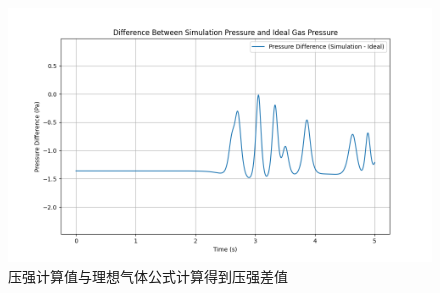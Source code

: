 \documentclass[11pt]{article}
\begin{document}
\begin{question}
\begin{figure}[H]
  \centering
  \includegraphics[width=0.7\columnwidth]{1/e3.png}
  \caption{压强计算值与理想气体公式计算得到压强差值}
\end{figure}



\end{question}
\end{document}
